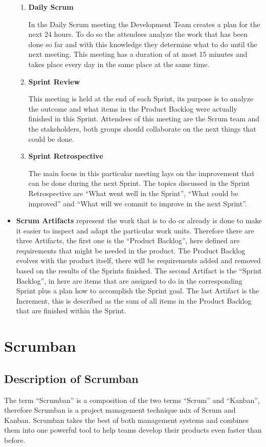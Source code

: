 \begin{itemize}
\begin{enumerate}
        \item \textbf{Daily Scrum}

        In the Daily Scrum meeting the Development Team creates a plan for the next 24 hours. To do so the attendees analyze the work that has been done so far and with this knowledge they determine what to do until the next meeting. This meeting has a duration of at most 15 minutes and takes place every day in the same place at the same time.

        \item \textbf{Sprint Review}

        This meeting is held at the end of each Sprint, its purpose is to analyze the outcome and what items in the Product Backlog were actually finished in this Sprint. Attendees of this meeting are the Scrum team and the stakeholders, both groups should collaborate on the next things that could be done.

        \item \textbf{Sprint Retrospective}

        The main focus in this particular meeting lays on the improvement that can be done during the next Sprint. The topics discussed in the Sprint Retrospective are ``What went well in the Sprint'', ``What could be improved'' and ``What will we commit to improve in the next Sprint''.
    \end{enumerate}

    \item \textbf{Scrum Artifacts} represent the work that is to do or already is done to make it easier to inspect and adapt the particular work units. Therefore there are three Artifacts, the first one is the ``Product Backlog'', here defined are requirements that might be needed in the product. The Product Backlog evolves with the product itself, there will be requirements added and removed based on the results of the Sprints finished. The second Artifact is the ``Sprint Backlog'', in here are items that are assigned to do in the corresponding Sprint plus a plan how to accomplish the Sprint goal. The last Artifact is the Increment, this is described as the sum of all items in the Product Backlog that are finished within the Sprint.
\end{itemize}

\section{Scrumban}

\subsection{Description of Scrumban}
The term ``Scrumban'' is a composition of the two terms ``Scrum'' and ``Kanban'', therefore Scrumban is a project management technique mix of Scrum and Kanban. Scrumban takes the best of both management systems and combines them into one powerful tool to help teams develop their products even faster than before.

